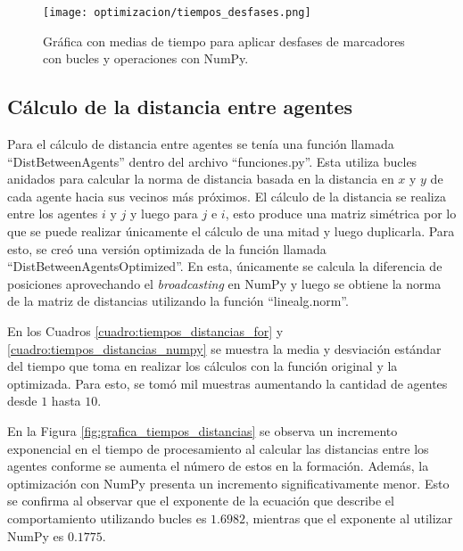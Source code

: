 \begin{figure}[H]
	\centering
	\texttt{[image: optimizacion/tiempos\_desfases.png]}
	\caption{Gráfica con medias de tiempo para aplicar desfases de marcadores con bucles y operaciones con NumPy.}
	\label{fig:grafica_tiempos_desfases}
\end{figure}

\subsection{Cálculo de la distancia entre agentes}
Para el cálculo de distancia entre agentes se tenía una función llamada ``DistBetweenAgents'' dentro del archivo ``funciones.py''. Esta utiliza bucles anidados para calcular la norma de distancia basada en la distancia en $x$ y $y$ de cada agente hacia sus vecinos más próximos. El cálculo de la distancia se realiza entre los agentes $i$ y $j$ y luego para $j$ e $i$, esto produce una matriz simétrica por lo que se puede realizar únicamente el cálculo de una mitad y luego duplicarla. Para esto, se creó una versión optimizada de la función llamada ``DistBetweenAgentsOptimized''. En esta, únicamente se calcula la diferencia de posiciones aprovechando el \textit{broadcasting} en NumPy y luego se obtiene la norma de la matriz de distancias utilizando la función ``linealg.norm''.

En los Cuadros \ref{cuadro:tiempos_distancias_for} y \ref{cuadro:tiempos_distancias_numpy} se muestra la media y desviación estándar del tiempo que toma en realizar los cálculos con la función original y la optimizada. Para esto, se tomó mil muestras aumentando la cantidad de agentes desde $1$ hasta $10$. 

En la Figura \ref{fig:grafica_tiempos_distancias} se observa un incremento exponencial en el tiempo de procesamiento al calcular las distancias entre los agentes conforme se aumenta el número de estos en la formación. Además, la optimización con NumPy presenta un incremento significativamente menor. Esto se confirma al observar que el exponente de la ecuación que describe el comportamiento utilizando bucles es $1.6982$, mientras que el exponente al utilizar NumPy es $0.1775$.

